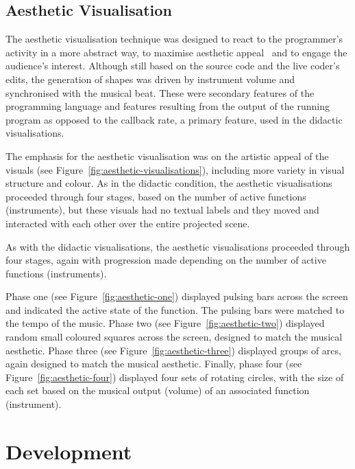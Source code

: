 

\subsection{Aesthetic Visualisation}
\label{sec:aesthetic-visualisation}

The aesthetic visualisation technique was designed to react to the programmer's activity in a more abstract way, to maximise aesthetic appeal~\cite{Cawthon2007} and to engage the audience's interest. Although still based on the source code and the live coder's edits, the generation of shapes was driven by instrument volume and synchronised with the musical beat. These were secondary features of the programming language and features resulting from the output of the running program as opposed to the callback rate, a primary feature, used in the didactic visualisations.

The emphasis for the aesthetic visualisation was on the artistic appeal of the visuals (see Figure~\ref{fig:aesthetic-visualisations}), including more variety in visual structure and colour. As in the didactic condition, the aesthetic visualisations proceeded through four stages, based on the number of active functions (instruments), but these visuals had no textual labels and they moved and interacted with each other over the entire projected scene.

As with the didactic visualisations, the aesthetic visualisations proceeded through four stages, again with progression made depending on the number of active functions (instruments).

Phase one (see Figure~\ref{fig:aesthetic-one}) displayed pulsing bars across the screen and indicated the active state of the function. The pulsing bars were matched to the tempo of the music. Phase two (see Figure~\ref{fig:aesthetic-two}) displayed random small coloured squares across the screen, designed to match the musical aesthetic. Phase three (see Figure~\ref{fig:aesthetic-three}) displayed groups of arcs, again designed to match the musical aesthetic. Finally, phase four (see Figure~\ref{fig:aesthetic-four}) displayed four sets of rotating circles, with the size of each set based on the musical output (volume) of an associated function (instrument).

\section{Development}

